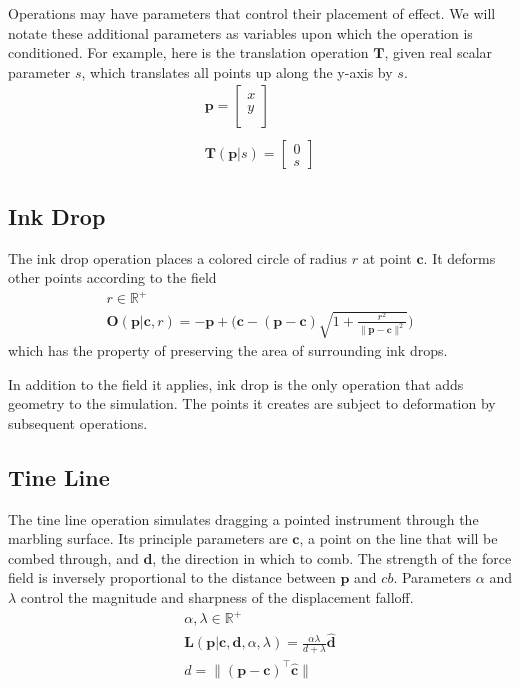 \documentclass{article}
\newcommand{\cb}{\boldsymbol{c}}
\newcommand{\db}{\boldsymbol{d}}
\newcommand{\pb}{\boldsymbol{p}}
\newcommand{\Tb}{\boldsymbol{T}}
\begin{document}
Operations may have parameters that control their placement of effect. We will notate these additional parameters as variables upon which the operation is conditioned. For example, here is the translation operation $\Tb$, given real scalar parameter $s$, which translates all points up along the y-axis by $s$. 
\begin{gather*}
			\pb = \begin{bmatrix}
	x \\
	y\\
	\end{bmatrix}\\
	\\
	\Tb(\pb | s) = \begin{bmatrix}
	0 \\
	s
	\end{bmatrix}
\end{gather*}

\subsection{Ink Drop}

The ink drop operation places a colored circle of radius $r$ at point $\cb$. It deforms other points according to the field 
\begin{gather*}
	r \in \mathbb{R}^+\\
	\boldsymbol{O}(\pb | \cb, r) =  -\pb + \Bigg(\cb - (\pb - \cb )\sqrt{1 + \frac{r^2}{\lVert\pb - \cb\rVert^2}}\Bigg)
\end{gather*}
which has the property of preserving the area of surrounding ink drops.

In addition to the field it applies, ink drop is the only operation that adds geometry to the simulation. The points it creates are subject to deformation by subsequent operations. 

\subsection{Tine Line}
The tine line operation simulates dragging a pointed instrument through the marbling surface. Its principle parameters are $\cb$, a point on the line that will be combed through, and $\db$, the direction in which to comb. The strength of the force field is inversely proportional to the distance between $\pb$ and $cb$. Parameters $\alpha$ and $\lambda$ control the magnitude and sharpness of the displacement falloff. 
\begin{gather*} 
	\alpha, \lambda \in \mathbb{R}^+\\
	\boldsymbol{L}(\pb | \cb, \db, \alpha, \lambda) = \frac{\alpha\lambda}{d + \lambda}\hat{\db} \\	
    d = \lVert(\pb - \cb) ^ \top \hat{\cb}\rVert
\end{gather*}
\end{document}
